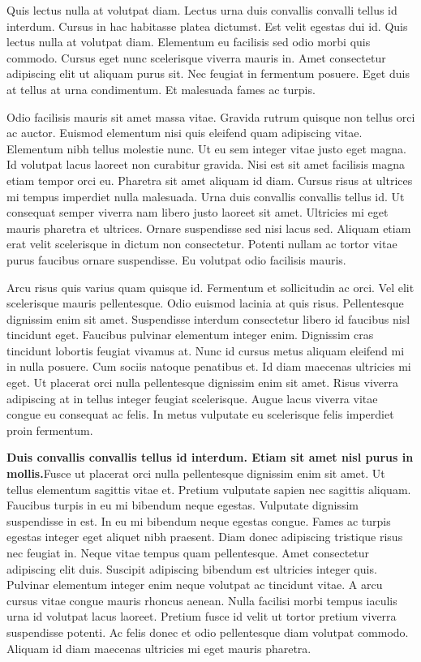 \documentclass[]{article}
\begin{document}
Quis lectus nulla at volutpat diam. Lectus urna duis convallis convalli  tellus id interdum. Cursus in hac habitasse platea dictumst. Est velit egestas dui id. Quis lectus nulla at volutpat diam. Elementum eu facilisis sed odio morbi quis commodo. Cursus eget nunc scelerisque viverra mauris in. Amet consectetur adipiscing elit ut aliquam purus sit. Nec feugiat in fermentum posuere. Eget duis at tellus at urna condimentum. Et malesuada fames ac turpis.

Odio facilisis mauris sit amet massa vitae. Gravida rutrum quisque non tellus orci ac auctor. Euismod elementum nisi quis eleifend quam adipiscing vitae. Elementum nibh tellus molestie nunc. Ut eu sem integer vitae justo eget magna. Id volutpat lacus laoreet non curabitur gravida. Nisi est sit amet facilisis magna etiam tempor orci eu. Pharetra sit amet aliquam id diam. Cursus risus at ultrices mi tempus imperdiet nulla malesuada. Urna duis convallis convallis tellus id. Ut consequat semper viverra nam libero justo laoreet sit amet. Ultricies mi eget mauris pharetra et ultrices. Ornare suspendisse sed nisi lacus sed. Aliquam etiam erat velit scelerisque in dictum non consectetur. Potenti nullam ac tortor vitae purus faucibus ornare suspendisse. Eu volutpat odio facilisis mauris.

Arcu risus quis varius quam quisque id. Fermentum et sollicitudin ac orci. Vel elit scelerisque mauris pellentesque. Odio euismod lacinia at quis risus. Pellentesque dignissim enim sit amet. Suspendisse interdum consectetur libero id faucibus nisl tincidunt eget. Faucibus pulvinar elementum integer enim. Dignissim cras tincidunt lobortis feugiat vivamus at. Nunc id cursus metus aliquam eleifend mi in nulla posuere. Cum sociis natoque penatibus et. Id diam maecenas ultricies mi eget. Ut placerat orci nulla pellentesque dignissim enim sit amet. Risus viverra adipiscing at in tellus integer feugiat scelerisque. Augue lacus viverra vitae congue eu consequat ac felis. In metus vulputate eu scelerisque felis imperdiet proin fermentum.

\textbf{Duis convallis convallis tellus id interdum. Etiam sit amet nisl purus in mollis.}Fusce ut placerat orci nulla pellentesque dignissim enim sit amet. Ut tellus elementum sagittis vitae et. Pretium vulputate sapien nec sagittis aliquam. Faucibus turpis in eu mi bibendum neque egestas. Vulputate dignissim suspendisse in est. In eu mi bibendum neque egestas congue. Fames ac turpis egestas integer eget aliquet nibh praesent. Diam donec adipiscing tristique risus nec feugiat in. Neque vitae tempus quam pellentesque. Amet consectetur adipiscing elit duis. Suscipit adipiscing bibendum est ultricies integer quis. Pulvinar elementum integer enim neque volutpat ac tincidunt vitae. A arcu cursus vitae congue mauris rhoncus aenean. Nulla facilisi morbi tempus iaculis urna id volutpat lacus laoreet. Pretium fusce id velit ut tortor pretium viverra suspendisse potenti. Ac felis donec et odio pellentesque diam volutpat commodo. Aliquam id diam maecenas ultricies mi eget mauris pharetra.
\end{document}
